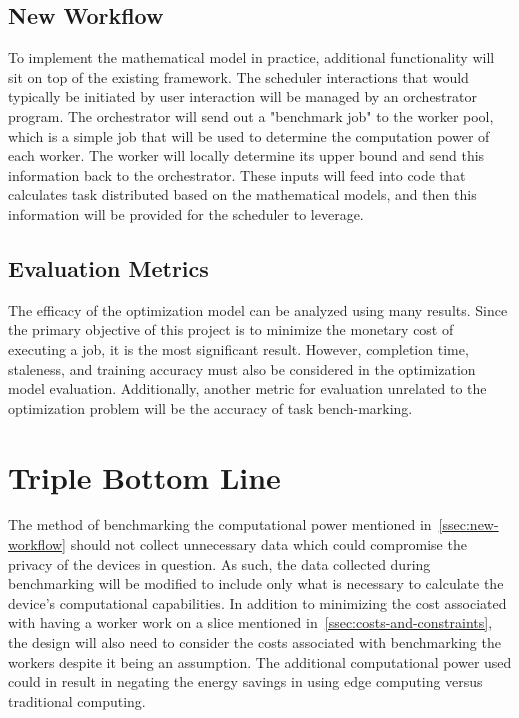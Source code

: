 \documentclass[../mthe-493-project-proposal.tex]{subfiles}
\begin{document}
    \subsection{New Workflow}
    \label{ssec:new-workflow}

    To implement the mathematical model in practice, additional functionality will sit on top of the existing framework. The scheduler interactions that would typically be initiated by user interaction will be managed by an orchestrator program. The orchestrator will send out a "benchmark job" to the worker pool, which is a simple job that will be used to determine the computation power of each worker. The worker will locally determine its upper bound and send this information back to the orchestrator. These inputs will feed into code that calculates task distributed based on the mathematical models, and then this information will be provided for the scheduler to leverage.

    \subsection{Evaluation Metrics}

    The efficacy of the optimization model can be analyzed using many results. Since the primary objective of this project is to minimize the monetary cost of executing a job, it is the most significant result. However, completion time, staleness, and training accuracy must also be considered in the optimization model evaluation. Additionally, another metric for evaluation unrelated to the optimization problem will be the accuracy of task bench-marking.

    \section{Triple Bottom Line}
    The method of benchmarking the computational power mentioned in~\autoref{ssec:new-workflow} should not collect unnecessary data which could compromise the privacy of the devices in question. As such, the data collected during benchmarking will be modified to include only what is necessary to calculate the device's computational capabilities. In addition to minimizing the cost associated with having a worker work on a slice mentioned in~\autoref{ssec:costs-and-constraints}, the design will also need to consider the costs associated with benchmarking the workers despite it being an assumption. The additional computational power used could in result in negating the energy savings in using edge computing versus traditional computing.
\end{document}
